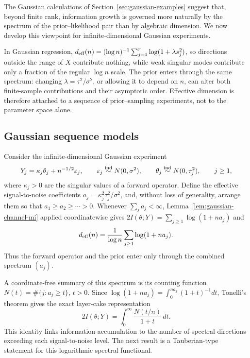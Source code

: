 \documentclass[11pt]{article}
\theoremstyle{plain}
\theoremstyle{definition}
\theoremstyle{remark}
\begin{document}
The Gaussian calculations of Section~\ref{sec:gaussian-examples} suggest that, beyond finite rank, information growth is governed more naturally by the spectrum of the prior--likelihood pair than by algebraic dimension. We now develop this viewpoint for infinite-dimensional Gaussian experiments.

In Gaussian regression, \(d_{\rm eff}(n)=(\log n)^{-1}\sum_{j=1}^r\log(1+\lambda s_j^2)\), so directions outside the range of \(X\) contribute nothing, while weak singular modes contribute only a fraction of the regular \(\log n\) scale. The prior enters through the same spectrum: changing \(\lambda=\tau^2/\sigma^2\), or allowing it to depend on \(n\), can alter both finite-sample contributions and their asymptotic order. Effective dimension is therefore attached to a sequence of prior--sampling experiments, not to the parameter space alone.

\subsection{Gaussian sequence models}
\label{subsec:gaussian-sequence}

Consider the infinite-dimensional Gaussian experiment
\[
Y_j=\kappa_j\theta_j+n^{-1/2}\varepsilon_j,\qquad
\varepsilon_j\stackrel{\rm ind}{\sim}N(0,\sigma^2),\qquad
\theta_j\stackrel{\rm ind}{\sim}N(0,\tau_j^2),\qquad j\geq1,
\]
where \(\kappa_j>0\) are the singular values of a forward operator. Define the effective signal-to-noise coefficients \(a_j=\kappa_j^2\tau_j^2/\sigma^2\), and, without loss of generality, arrange them so that \(a_1\geq a_2\geq\cdots>0\). Whenever \(\sum_j a_j<\infty\), Lemma~\ref{lem:gaussian-channel-mi} applied coordinatewise gives \(2I(\theta;Y)=\sum_{j\geq1}\log(1+na_j)\) and
\[
d_{\rm eff}(n)=\frac{1}{\log n}\sum_{j\geq1}\log(1+na_j).
\]
Thus the forward operator and the prior enter only through the combined spectrum \((a_j)\).

A coordinate-free summary of this spectrum is its counting function \(N(t)=\#\{j:a_j\geq t\}\), \(t>0\). Since \(\log(1+na_j)=\int_0^{na_j}(1+t)^{-1}dt\), Tonelli's theorem gives the exact layer-cake representation
\begin{equation}
	\label{eq:counting-representation}
	2I(\theta;Y)=\int_0^\infty\frac{N(t/n)}{1+t}\,dt.
\end{equation}
This identity links information accumulation to the number of spectral directions exceeding each signal-to-noise level. The next result is a Tauberian-type statement for this logarithmic spectral functional.
\end{document}

